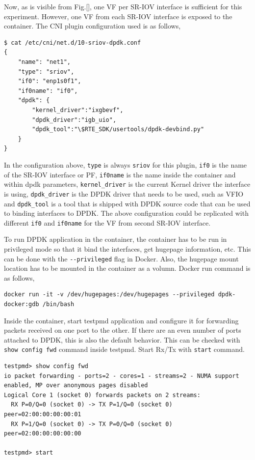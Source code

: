 \documentclass[english, 12pt, a4paper, elec, utf8, a-1b, online]{aaltothesis}
\begin{document}
Now, as is visible from Fig.[], one VF per SR-IOV interface is sufficient for this experiment. However, one VF from each SR-IOV interface is exposed to the container. The CNI plugin configuration used is as follows,
\begin{lstlisting}[basicstyle={\small\ttfamily}]
$ cat /etc/cni/net.d/10-sriov-dpdk.conf
{
    "name": "net1",
    "type": "sriov",
    "if0": "enp1s0f1",
    "if0name": "if0",
    "dpdk": {
        "kernel_driver":"ixgbevf",
        "dpdk_driver":"igb_uio",
        "dpdk_tool":"\$RTE_SDK/usertools/dpdk-devbind.py"
    }
}
\end{lstlisting}

In the configuration above, \lstinline{type} is always \lstinline{sriov} for this plugin, \lstinline{if0} is the name of the SR-IOV interface or PF, \lstinline{if0name} is the name inside the container and within dpdk parameters, \lstinline{kernel_driver} is the current Kernel driver the interface is using, \lstinline{dpdk_driver} is the DPDK driver that needs to be used, such as VFIO and \lstinline{dpdk_tool} is a tool that is shipped with DPDK source code that can be used to binding interfaces to DPDK. The above configuration could be replicated with different \lstinline{if0} and \lstinline{if0name} for the VF from second SR-IOV interface.

To run DPDK application in the container, the container has to be run in privileged mode so that it bind the interfaces, get hugepage information, etc. This can be done with the \lstinline{--privileged} flag in Docker. Also, the hugepage mount location has to be mounted in the container as a volumn. Docker run command is as follows,
\begin{lstlisting}[basicstyle={\small\ttfamily}]
docker run -it -v /dev/hugepages:/dev/hugepages --privileged dpdk-docker:gdb /bin/bash
\end{lstlisting}

Inside the container, start testpmd application and configure it for forwarding packets received on one port to the other. If there are an even number of ports attached to DPDK, this is also the default behavior. This can be checked with \lstinline{show config fwd} command inside testpmd. Start Rx/Tx with \lstinline{start} command.

\begin{lstlisting}[basicstyle={\small\ttfamily}]
testpmd> show config fwd
io packet forwarding - ports=2 - cores=1 - streams=2 - NUMA support enabled, MP over anonymous pages disabled
Logical Core 1 (socket 0) forwards packets on 2 streams:
  RX P=0/Q=0 (socket 0) -> TX P=1/Q=0 (socket 0) peer=02:00:00:00:00:01
  RX P=1/Q=0 (socket 0) -> TX P=0/Q=0 (socket 0) peer=02:00:00:00:00:00

testpmd> start
\end{lstlisting}
\end{document}
